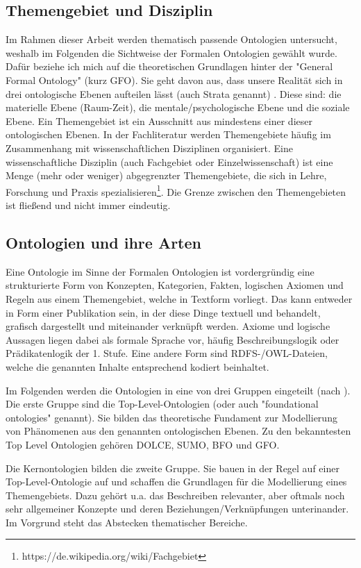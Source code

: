 \documentclass{article}
\begin{document}
\subsection{Themengebiet und Disziplin}

Im Rahmen dieser Arbeit werden thematisch passende Ontologien untersucht, weshalb im Folgenden die Sichtweise der Formalen Ontologien gewählt wurde. Dafür beziehe ich mich auf die theoretischen Grundlagen hinter der "General Formal Ontology" (kurz GFO). Sie geht davon aus, dass unsere Realität sich in drei ontologische Ebenen aufteilen lässt (auch Strata genannt) \cite{herre2006general}. Diese sind: die materielle Ebene (Raum-Zeit), die mentale/psychologische Ebene und die soziale Ebene. Ein Themengebiet ist ein Ausschnitt aus mindestens einer dieser ontologischen Ebenen.
In der Fachliteratur werden Themengebiete häufig im Zusammenhang mit wissenschaftlichen Disziplinen organisiert. Eine wissenschaftliche Disziplin (auch Fachgebiet oder Einzelwissenschaft) ist eine Menge (mehr oder weniger) abgegrenzter Themengebiete, die sich in Lehre, Forschung und Praxis spezialisieren\footnote{https://de.wikipedia.org/wiki/Fachgebiet}. Die Grenze zwischen den Themengebieten ist fließend und nicht immer eindeutig.

\subsection{Ontologien und ihre Arten}

Eine Ontologie im Sinne der Formalen Ontologien ist vordergründig eine strukturierte Form von Konzepten, Kategorien, Fakten, logischen Axiomen und Regeln aus einem Themengebiet, welche in Textform vorliegt. Das kann entweder in Form einer Publikation sein, in der diese Dinge textuell und behandelt, grafisch dargestellt und miteinander verknüpft werden. Axiome und logische Aussagen liegen dabei als formale Sprache vor, häufig Beschreibungslogik oder Prädikatenlogik der 1. Stufe. Eine andere Form sind RDFS-/OWL-Dateien, welche die genannten Inhalte entsprechend kodiert beinhaltet.

Im Folgenden werden die Ontologien in eine von drei Gruppen eingeteilt (nach \cite{hoehndorf2009developing}). Die erste Gruppe sind die Top-Level-Ontologien (oder auch "foundational ontologies" genannt). Sie bilden das theoretische Fundament zur Modellierung von Phänomenen aus den genannten ontologischen Ebenen. Zu den bekanntesten Top Level Ontologien gehören DOLCE, SUMO, BFO und GFO.

Die Kernontologien bilden die zweite Gruppe. Sie bauen in der Regel auf einer Top-Level-Ontologie auf und schaffen die Grundlagen für die Modellierung eines Themengebiets. Dazu gehört u.a. das Beschreiben relevanter, aber oftmals noch sehr allgemeiner Konzepte und deren Beziehungen/Verknüpfungen unterinander. Im Vorgrund steht das Abstecken thematischer Bereiche.
\end{document}
